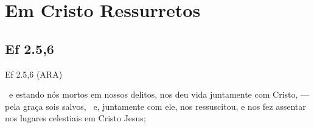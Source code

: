 \documentclass[12pt,aspectratio=169]{beamer}
\newcommand{\ver}[1]{%
    \raisebox{0.50ex}{%
        \scalebox{1.1}{%
            \pmb{\textbf{\textcolor{BSpbg}{#1}}}%
        }%
    }%
}
\newcommand{\QUOTE}[1]{%
    \par\noindent\hspace*{0.05\linewidth}%
    \begin{minipage}{0.9\linewidth}%
        \linespread{1.35}\large{#1}%
    \end{minipage}%
}
\newcommand{\YEL}[1]{{\textcolor{TXyel}{#1}}}
\newcommand{\CYA}[1]{{\textcolor{TXcya}{#1}}}
\newcommand{\MAG}[1]{{\textcolor{TXmag}{#1}}}
\begin{document}
\section{Em Cristo Ressurretos}

    \subsection{Ef 2.5,6}

    \begin{frame}{Ef 2.5,6 (ARA)}
        \QUOTE{%
            \ver{5}~e estando nós mortos em nossos delitos, nos deu vida \MAG{juntamente com
            Cristo}, --- pela graça sois salvos,
            \ver{6}~e, \YEL{juntamente com ele, nos ressuscitou}, e nos fez \CYA{assentar nos
            lugares celestiais} \MAG{em Cristo Jesus};
        }
    \end{frame}

\end{document}
